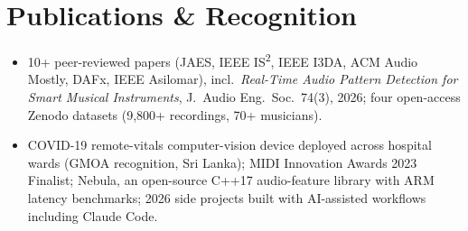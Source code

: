 \documentclass[11pt]{article}
\begin{document}
\section*{Publications \& Recognition}
\begin{itemize}[leftmargin=1.2em, itemsep=-0.25em]
    \item 10+ peer-reviewed papers (JAES, IEEE IS\textsuperscript{2}, IEEE I3DA, ACM Audio Mostly, DAFx, IEEE Asilomar), incl.\ \textit{Real-Time Audio Pattern Detection for Smart Musical Instruments}, J.\ Audio Eng.\ Soc.\ 74(3), 2026; four open-access Zenodo datasets (9,800+ recordings, 70+ musicians).
    \item COVID-19 remote-vitals computer-vision device deployed across hospital wards (GMOA recognition, Sri Lanka); MIDI Innovation Awards 2023 Finalist; Nebula, an open-source C++17 audio-feature library with ARM latency benchmarks; 2026 side projects built with AI-assisted workflows including Claude Code.
\end{itemize}
\end{document}
